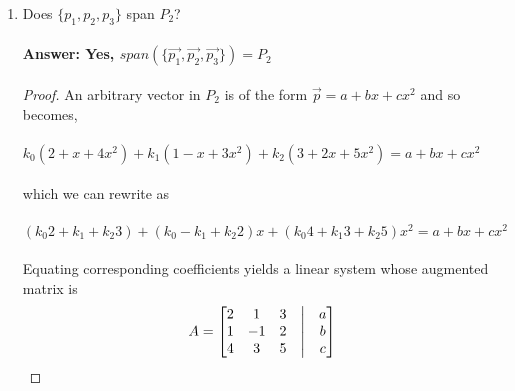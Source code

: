 \documentclass[12pt]{article}
\begin{document}
\begin{enumerate}
\begin{enumerate}
\begin{proof}
\begin{align*}
\begin{bmatrix}
                                                    0 & 0 & 1 & \bigm| & 1  \\
                                            \end{bmatrix}
                                    \end{align*}
                                    \begin{equation*}
                                            \therefore (k_{1}, k_{2}, k_{3}) = (4, -5, 1) \\
                                    \end{equation*}
                            \end{proof}
                            \pagebreak
                      \item Does $\{p_1,p_2,p_3\}$ span $P_2$?
                            \paragraph{Answer: Yes, $span(\{\vec{p_{1}},\vec{p_{2}},\vec{p_{3}}\}) = P_{2}$}
                            \begin{proof}
                                    An arbitrary vector in $P_{2}$ is of the form $\vec{p}=a+bx+cx^2$ and so becomes,\\\\
                                    $k_{0}(2 + x + 4x^2) +  k_{1}(1 - x + 3x^2) + k_{2}(3 + 2x + 5x^2) = a+bx+cx^2$\\\\
                                    which we can rewrite as \\\\
                                    $(k_{0}2 + k_{1} + k_{2}3) + (k_{0} - k_{1} + k_{2}2)x + (k_{0}4 + k_{1}3 + k_{2}5)x^2 = a+bx+cx^2$\\\\
                                    Equating corresponding coefficients yields a linear system whose augmented matrix is
                                    \begin{align*}
                                            A =
                                            \begin{bmatrix}
                                                    2 & 1  & 3 & \bigm| & a \\
                                                    1 & -1 & 2 & \bigm| & b \\
                                                    4 & 3  & 5 & \bigm| & c \\

\end{bmatrix}
\end{align*}
\end{proof}
\end{enumerate}
\end{enumerate}
\end{document}
